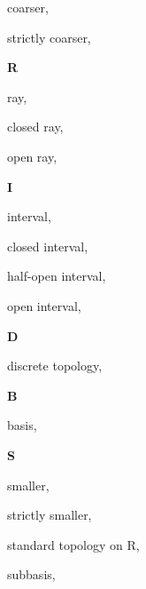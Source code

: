 \begin{multicols}{2}
coarser, \pageref{def:Comparable}

\hspace{2em}strictly coarser, \pageref{def:Comparable}

\vspace{1em}\large{\textbf{R}}

ray, \pageref{def:Ray}

\hspace{2em}closed ray, \pageref{def:Ray}

\hspace{2em}open ray, \pageref{def:Ray}

\vspace{1em}\large{\textbf{I}}

interval, \pageref{def:Interval}

\hspace{2em}closed interval, \pageref{def:Interval}

\hspace{2em}half-open interval, \pageref{def:Interval}

\hspace{2em}open interval, \pageref{def:Interval}

\vspace{1em}\large{\textbf{D}}

discrete topology, \pageref{def:DiscreteTopology}

\vspace{1em}\large{\textbf{B}}

basis, \pageref{def:Basis}

\vspace{1em}\large{\textbf{S}}

smaller, \pageref{def:Comparable}

\hspace{2em}strictly smaller, \pageref{def:Comparable}

standard topology on R, \pageref{def:StandardTopologyOnTheRealLine}

subbasis, \pageref{def:Subbasis}

\end{multicols}
